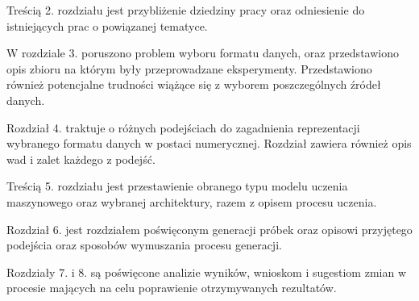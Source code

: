 {{        Treścią 2. rozdziału jest przybliżenie dziedziny pracy oraz odniesienie do istniejących prac o\,\,powiązanej tematyce.
        
        W\,\,rozdziale 3. poruszono problem wyboru formatu danych, oraz przedstawiono opis zbioru na którym
        były przeprowadzane eksperymenty. Przedstawiono również potencjalne trudności wiążące się z\,\,wyborem
        poszczególnych źródeł danych.

        Rozdział 4. traktuje o\,\,różnych podejściach do zagadnienia reprezentacji wybranego formatu 
        danych w\,\,postaci numerycznej. Rozdział zawiera również opis wad i\,\,zalet każdego z\,\,podejść.

        Treścią 5. rozdziału jest przestawienie obranego typu modelu uczenia maszynowego oraz 
        wybranej architektury, razem z\,\,opisem procesu uczenia.

        Rozdział 6. jest rozdziałem poświęconym generacji próbek oraz opisowi przyjętego podejścia oraz sposobów 
        wymuszania procesu generacji.

        Rozdziały 7. i\,\,8. są poświęcone analizie wyników, wnioskom i\,\,sugestiom zmian w\,\,procesie mających na celu 
        poprawienie otrzymywanych rezultatów.
    }
}



